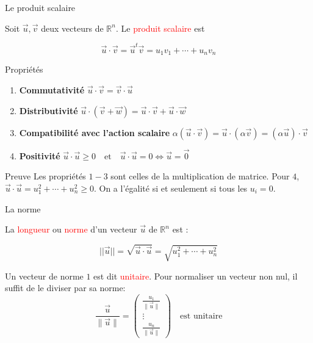 \begin{parag}{Le produit scalaire}
    \begin{definition}
        Soit $\vec{u}, \vec{v}$ deux vecteurs de $\mathbb{R}^n$. Le \textcolor{red}{produit scalaire} est
        \begin{formule}
            \[\vec{u}\cdot\vec{v}= \vec{u}^t\vec{v} = u_1v_1 + \cdots + u_nv_n\]
        \end{formule}
    \end{definition}
    \begin{subparag}{Propriétés}
\begin{enumerate}
    \item \textbf{Commutativité} 
    $\vec{u} \cdot \vec{v} = \vec{v} \cdot \vec{u}$
    
    \item \textbf{Distributivité} 
    $\vec{u} \cdot (\vec{v} + \vec{w}) = \vec{u} \cdot \vec{v} + \vec{u} \cdot \vec{w}$
    
    \item \textbf{Compatibilité avec l'action scalaire}
    $\alpha (\vec{u} \cdot \vec{v}) = \vec{u} \cdot (\alpha \vec{v}) = (\alpha \vec{u}) \cdot \vec{v}$
    
    \item \textbf{Positivité} 
    $\vec{u} \cdot \vec{u} \geq 0 \quad \text{et} \quad \vec{u} \cdot \vec{u} = 0 \iff \vec{u} = \vec{0}$
\end{enumerate}

    \end{subparag}
    \begin{subparag}{Preuve}
        Les propriétés $1-3$ sont celles de la multiplication de matrice. Pour $4$, $\vec{u}\cdot\vec{u} = u_1^2 + \cdots + u_n^2\geq 0.$ On a l'égalité si et seulement si tous les $u_i = 0$.
    \end{subparag}
\end{parag}
\begin{parag}{La norme}
    \begin{definition}
        La \textcolor{red}{longueur} ou \textcolor{red}{norme} d'un vecteur $\vec{u}$ de $\mathbb{R}^n$ est :
        \begin{formule}
            \[||\vec{u}|| = \sqrt{\vec{u}\cdot\vec{u}} = \sqrt{u_1^2 + \cdots + u_n^2}\]
        \end{formule}
    \end{definition}
    Un vecteur de norme $1$ est dit \textcolor{red}{unitaire}. Pour normaliser un vecteur non nul, il suffit de le diviser par sa norme:
    \[
\frac{\vec{u}}{\|\vec{u}\|} =
\begin{pmatrix}
\frac{u_1}{\|\vec{u}\|} \\
\vdots \\
\frac{u_n}{\|\vec{u}\|}
\end{pmatrix}
\quad \text{est unitaire}
\]


\end{parag}

